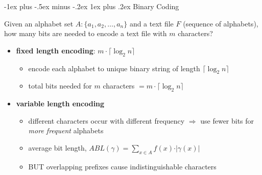 \documentclass[10pt,landscape]{article}
\makeatletter
\renewcommand{\subsubsection}{\@startsection{subsubsection}{3}{0mm}%
                                {-1ex plus -.5ex minus -.2ex}%
                                {1ex plus .2ex}%
                                {\normalfont\small\bfseries}}
\newcommand{\1}{\mathmybb{1}}
\makeatother
\begin{document}
\begin{multicols*}{3}
  \subsubsection{Binary Coding}

  Given an alphabet set $A: \{ a_1, a_2, \dots, a_n \}$ and a text file $F$ (sequence of alphabets), 
  how many bits are needed to encode a text file with $m$ characters?

  \begin{itemize}[topsep=0pt,noitemsep,wide=0pt, leftmargin=\dimexpr{} + 2\relax]
    \item \textbf{fixed length encoding}: $m \cdot \lceil \log_2 n \rceil $
      \begin{itemize}[topsep=0pt,noitemsep,wide=0pt, leftmargin=\dimexpr{} + 2\relax]
        \item encode each alphabet to unique binary string of length $ \lceil \log_2 n \rceil  $
        \item total bits needed for $m$ characters $= m \cdot \lceil \log_2 n \rceil $
      \end{itemize}
    \item \textbf{variable length encoding}
      \begin{itemize}[topsep=0pt,noitemsep,wide=0pt, leftmargin=\dimexpr{} + 2\relax]
        \item different characters occur with different frequency $\Rightarrow$ use fewer bits for \textit{more frequent} alphabets
        \item average bit length,  $ABL(\gamma) = \sum\limits_{x \in A} f(x) \cdot \vert \gamma(x) \vert$
        \item BUT overlapping prefixes cause indistinguishable characters
      \end{itemize}
  \end{itemize}


\end{multicols*}
\end{document}
